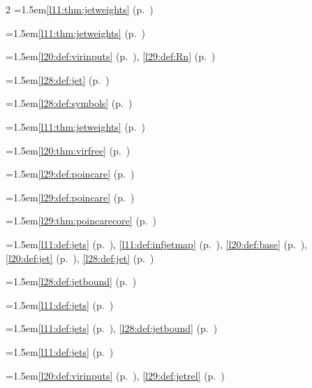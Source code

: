 \begin{multicols}{2}
\hangindent=1.5em\quad \ref{l11:thm:jetweights} (p.~\pageref{l11:thm:jetweights})\par
\hangindent=1.5em\quad \ref{l11:thm:jetweights} (p.~\pageref{l11:thm:jetweights})\par
\hangindent=1.5em\quad \ref{l20:def:virinputs} (p.~\pageref{l20:def:virinputs}), \ref{l29:def:Rn} (p.~\pageref{l29:def:Rn})\par
\hangindent=1.5em\quad \ref{l28:def:jet} (p.~\pageref{l28:def:jet})\par
\hangindent=1.5em\quad \ref{l28:def:symbols} (p.~\pageref{l28:def:symbols})\par
\hangindent=1.5em\quad \ref{l11:thm:jetweights} (p.~\pageref{l11:thm:jetweights})\par
\hangindent=1.5em\quad \ref{l20:thm:virfree} (p.~\pageref{l20:thm:virfree})\par
\hangindent=1.5em\quad \ref{l29:def:poincare} (p.~\pageref{l29:def:poincare})\par
\hangindent=1.5em\quad \ref{l29:def:poincare} (p.~\pageref{l29:def:poincare})\par
\hangindent=1.5em\quad \ref{l29:thm:poincarecore} (p.~\pageref{l29:thm:poincarecore})\par
\hangindent=1.5em\quad \ref{l11:def:jets} (p.~\pageref{l11:def:jets}), \ref{l11:def:infjetmap} (p.~\pageref{l11:def:infjetmap}), \ref{l20:def:base} (p.~\pageref{l20:def:base}), \ref{l20:def:jet} (p.~\pageref{l20:def:jet}), \ref{l28:def:jet} (p.~\pageref{l28:def:jet})\par
\hangindent=1.5em\quad \ref{l28:def:jetbound} (p.~\pageref{l28:def:jetbound})\par
\hangindent=1.5em\quad \ref{l11:def:jets} (p.~\pageref{l11:def:jets})\par
\hangindent=1.5em\quad \ref{l11:def:jets} (p.~\pageref{l11:def:jets}), \ref{l28:def:jetbound} (p.~\pageref{l28:def:jetbound})\par
\hangindent=1.5em\quad \ref{l11:def:jets} (p.~\pageref{l11:def:jets})\par
\hangindent=1.5em\quad \ref{l20:def:virinputs} (p.~\pageref{l20:def:virinputs}), \ref{l29:def:jetrel} (p.~\pageref{l29:def:jetrel})\par

\end{multicols}
